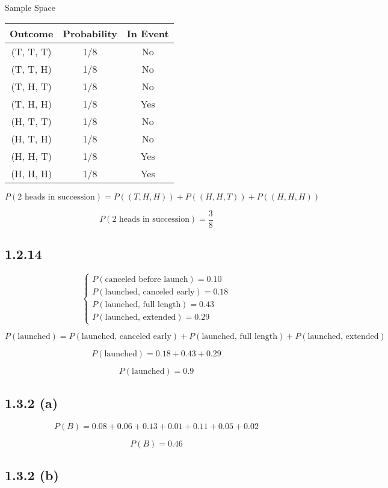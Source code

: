 \documentclass{article}
\begin{document}
Sample Space

\begin{center}
\begin{tabular}{c|c|c}
Outcome & Probability & In Event \\
\hline
(T, T, T) & 1/8 & No \\
(T, T, H) & 1/8 & No \\
(T, H, T) & 1/8 & No \\
(T, H, H) & 1/8 & Yes \\
(H, T, T) & 1/8 & No \\
(H, T, H) & 1/8 & No \\
(H, H, T) & 1/8 & Yes \\
(H, H, H) & 1/8 & Yes
\end{tabular}
\end{center}

\[
P(2\text{ heads in succession}) =
P((T, H, H)) +
P((H, H, T)) +
P((H, H, H))
\]

\[
\boxed{P(2\text{ heads in succession}) = \frac{3}{8}}
\]


\subsection*{1.2.14}

\[
\begin{cases}
P(\text{canceled before launch}) = 0.10 \\
P(\text{launched, canceled early}) = 0.18 \\
P(\text{launched, full length}) = 0.43 \\
P(\text{launched, extended}) = 0.29
\end{cases}
\]

\[
P(\text{launched}) =
P(\text{launched, canceled early}) +
P(\text{launched, full length}) +
P(\text{launched, extended})
\]

\[
P(\text{launched}) = 0.18 + 0.43 + 0.29
\]

\[
\boxed{P(\text{launched}) = 0.9}
\]

\subsection*{1.3.2 (a)}

\[
P(B) = 0.08 + 0.06 + 0.13 + 0.01 + 0.11 + 0.05 + 0.02
\]

\[
\boxed{P(B) = 0.46}
\]

\subsection*{1.3.2 (b)}
\end{document}
